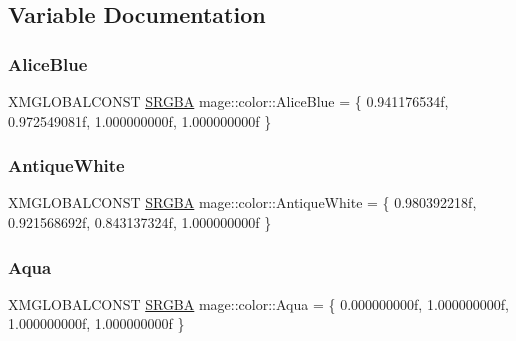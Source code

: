 \subsection{Variable Documentation}
\hypertarget{namespacemage_1_1color_ab53ddcebac20b67a9049b8a6f0419c7f}{}\label{namespacemage_1_1color_ab53ddcebac20b67a9049b8a6f0419c7f} 
\subsubsection{\texorpdfstring{Alice\+Blue}{AliceBlue}}
{\footnotesize\ttfamily X\+M\+G\+L\+O\+B\+A\+L\+C\+O\+N\+ST \hyperlink{structmage_1_1_s_r_g_b_a}{S\+R\+G\+BA} mage\+::color\+::\+Alice\+Blue = \{ 0.\+941176534f, 0.\+972549081f, 1.\+000000000f, 1.\+000000000f \}}

\hypertarget{namespacemage_1_1color_a31f9b8363eb47f4ba0a67ef2228c8d3c}{}\label{namespacemage_1_1color_a31f9b8363eb47f4ba0a67ef2228c8d3c} 
\subsubsection{\texorpdfstring{Antique\+White}{AntiqueWhite}}
{\footnotesize\ttfamily X\+M\+G\+L\+O\+B\+A\+L\+C\+O\+N\+ST \hyperlink{structmage_1_1_s_r_g_b_a}{S\+R\+G\+BA} mage\+::color\+::\+Antique\+White = \{ 0.\+980392218f, 0.\+921568692f, 0.\+843137324f, 1.\+000000000f \}}

\hypertarget{namespacemage_1_1color_a21c05fb85147ebac8af465293996ebfc}{}\label{namespacemage_1_1color_a21c05fb85147ebac8af465293996ebfc} 
\subsubsection{\texorpdfstring{Aqua}{Aqua}}
{\footnotesize\ttfamily X\+M\+G\+L\+O\+B\+A\+L\+C\+O\+N\+ST \hyperlink{structmage_1_1_s_r_g_b_a}{S\+R\+G\+BA} mage\+::color\+::\+Aqua = \{ 0.\+000000000f, 1.\+000000000f, 1.\+000000000f, 1.\+000000000f \}}

\hypertarget{namespacemage_1_1color_aa3c3740abf00170c3c80bcad52b8b1d1}{}\label{namespacemage_1_1color_aa3c3740abf00170c3c80bcad52b8b1d1} 
